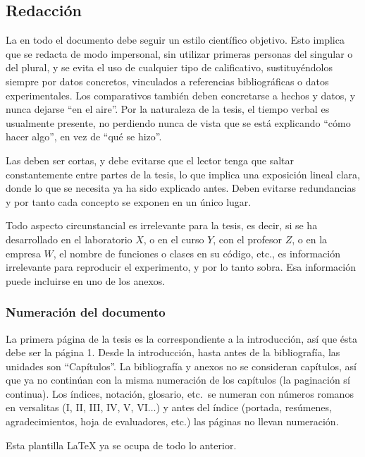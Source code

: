 \subsection{Redacción}

La  en todo el documento debe seguir un estilo científico
objetivo. Esto implica que se redacta de modo impersonal, sin utilizar primeras
personas del singular o del plural, y se evita el uso de cualquier tipo de
calificativo, sustituyéndolos siempre por datos concretos, vinculados a
referencias bibliográficas o datos experimentales. Los comparativos también
deben concretarse a hechos y datos, y nunca dejarse ``en el aire''. Por la
naturaleza de la tesis, el tiempo verbal es usualmente presente, no perdiendo
nunca de vista que se está explicando ``cómo hacer algo'', en vez de ``qué se
hizo''.

Las  deben ser cortas, y debe evitarse que el lector tenga que saltar
constantemente entre partes de la tesis, lo que implica una exposición lineal
clara, donde lo que se necesita ya ha sido explicado antes. Deben evitarse
redundancias y por tanto cada concepto se exponen en un único lugar.

Todo aspecto circunstancial es irrelevante para la tesis, es decir, si se ha
desarrollado en el laboratorio $X$, o en el curso $Y$, con el profesor $Z$, o
en la empresa $W$, el nombre de funciones o clases en su código, etc., es
información irrelevante para reproducir el experimento, y por lo tanto sobra.
%
Esa información puede incluirse en uno de los anexos.


\subsubsection{Numeración del documento}

La primera página de la tesis es la correspondiente a la introducción,
así que ésta debe ser la página 1. Desde la introducción, hasta antes
de la bibliografía, las unidades son ``Capítulos''. La bibliografía y
anexos no se consideran capítulos, así que ya no continúan con la
misma numeración de los capítulos (la paginación sí continua). Los
índices, notación, glosario, etc.\ se numeran con números romanos en
versalitas ({\textsc{I}, \textsc{II}, \textsc{III}, \textsc{IV},
  \textsc{V}, \textsc{VI}}$\ldots$) y antes del índice (portada,
resúmenes, agradecimientos, hoja de evaluadores, etc.) las páginas no
llevan numeración.

Esta plantilla LaTeX ya se ocupa de todo lo anterior.

